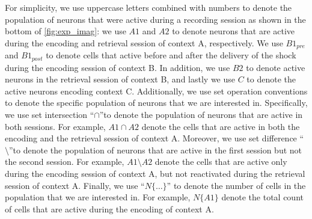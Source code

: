 \documentclass[master.tex]{subfiles}
\begin{document}
For simplicity, we use uppercase letters combined with numbers to denote the
population of neurons that were active during a recording session as shown in
the bottom of \autoref{fig:exp_imag}: we use $A1$ and $A2$ to denote neurons
that are active during the encoding and retrieval session of context A,
respectively. We use $B1_{pre}$ and $B1_{post}$ to denote cells that active
before and after the delivery of the shock during the encoding session of
context B. In addition, we use $B2$ to denote active neurons in the retrieval
session of context B, and lastly we use $C$ to denote the active neurons
encoding context C. Additionally, we use set operation conventions to denote the
specific population of neurons that we are interested in. Specifically, we use
set intersection ``$\cap$''to denote the population of neurons that are active
in both sessions. For example, $A1 \cap A2$ denote the cells that are active in
both the encoding and the retrieval session of context A. Moreover, we use set
difference ``$\setminus$''to denote the population of neurons that are active in
the first session but not the second session. For example, $A1 \setminus A2$
denote the cells that are active only during the encoding session of context A,
but not reactivated during the retrieval session of context A. Finally, we use
``$N\{\ldots\}$'' to denote the number of cells in the population that we are
interested in. For example, $N\{A1\}$ denote the total count of cells that are
active during the encoding of context A.
\end{document}
